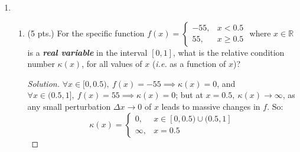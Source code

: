 \documentclass[12pt]{article}
\newcommand{\bfit}[1]{\textbf{\textit{#1}}}
\begin{document}
\begin{enumerate}
\begin{enumerate}
   \item
     \begin{enumerate}
     \item (5 pts.) For the specific function $f(x) = \left\{
         \begin{array}{rl} -55, & x<0.5 \\ 55, & x \ge 0.5 \end{array}
       \right.$ where $x\in\mathbb{R}$ is a \bfit{real variable} in
       the interval $[0,1]$, what is the relative condition number
       $\kappa(x)$, for all values of $x$ (\emph{i.e.}\/ as a function
       of $x$)?
       \begin{proof}[Solution]
       $\forall x \in [0, 0.5),\ f(x) = -55 \implies \kappa(x) = 0$, and $\forall x \in (0.5, 1],\ f(x) = 55 \implies \kappa(x) = 0$; but at $x = 0.5,\ \kappa(x) \to \infty$, as any small perturbation $\Delta x \to 0$ of $x$ leads to massive changes in $f$. So:
       $$\kappa(x) = \left\{
         \begin{array}{rl} 0, & x \in [0,0.5)\cup(0.5,1] \\ \infty, & x = 0.5 \end{array}
       \right.$$
       \end{proof}



\end{enumerate}
\end{enumerate}
\end{enumerate}
\end{document}
